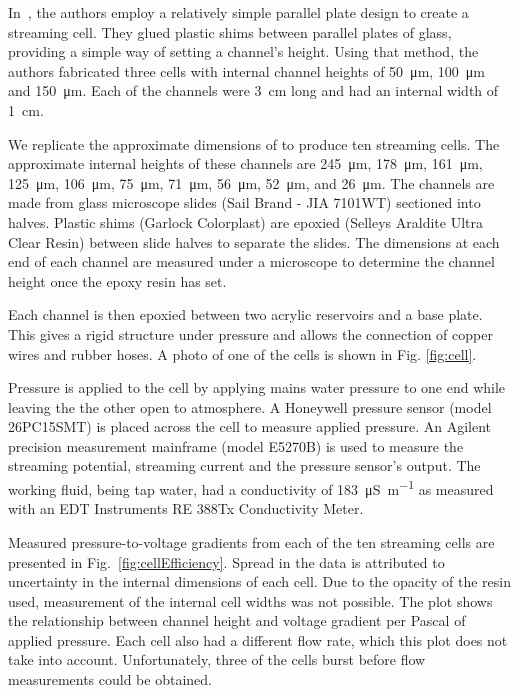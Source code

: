 \documentclass[10pt,final,journal]{IEEEtran}
\begin{document}
        In~\cite{Gu2000}, the authors employ a relatively simple parallel plate design to create a streaming cell.
        They glued plastic shims between parallel plates of glass, providing a simple way of setting a channel's height.
        Using that method, the authors fabricated three cells with internal channel heights of \SI{50}{\micro\metre}, \SI{100}{\micro\metre} and \SI{150}{\micro\metre}.
        Each of the channels were \SI{3}{\centi\metre} long and had an internal width of \SI{1}{\centi\metre}.

        We replicate the approximate dimensions of \cite{Gu2000} to produce ten streaming cells.
        The approximate internal heights of these channels are \SI{245}{\micro\metre}, \SI{178}{\micro\metre}, \SI{161}{\micro\metre}, \SI{125}{\micro\metre}, \SI{106}{\micro\metre}, \SI{75}{\micro\metre}, \SI{71}{\micro\metre}, \SI{56}{\micro\metre}, \SI{52}{\micro\metre}, and \SI{26}{\micro\metre}.
        The channels are made from glass microscope slides (Sail Brand - JIA 7101WT) sectioned into halves.
        Plastic shims (Garlock Colorplast) are epoxied (Selleys Araldite Ultra Clear Resin) between slide halves to separate the slides.
        The dimensions at each end of each channel are measured under a microscope to determine the channel height once the epoxy resin has set.

        Each channel is then epoxied between two acrylic reservoirs and a base plate.
        This gives a rigid structure under pressure and allows the connection of copper wires and rubber hoses.
        A photo of one of the cells is shown in Fig. \ref{fig:cell}.

        Pressure is applied to the cell by applying mains water pressure to one end while leaving the the other open to atmosphere.
        A Honeywell pressure sensor (model 26PC15SMT) is placed across the cell to measure applied pressure.
        An Agilent precision measurement mainframe (model E5270B) is used to measure the streaming potential, streaming current and the pressure sensor's output.
        The working fluid, being tap water, had a conductivity of \SI{183}{\micro\siemens\per\metre} as measured with an EDT Instruments RE 388Tx Conductivity Meter.

        Measured pressure-to-voltage gradients from each of the ten streaming cells are presented in Fig.~\ref{fig:cellEfficiency}.
        Spread in the data is attributed to uncertainty in the internal dimensions of each cell.
        Due to the opacity of the resin used, measurement of the internal cell widths was not possible.
        The plot shows the relationship between channel height and voltage gradient per Pascal of applied pressure.
        Each cell also had a different flow rate, which this plot does not take into account.
        Unfortunately, three of the cells burst before flow measurements could be obtained.
\end{document}
